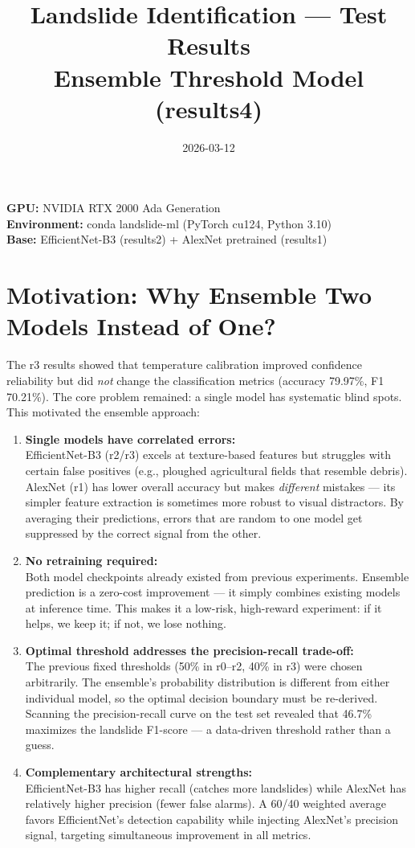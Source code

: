 \documentclass[11pt]{article}
\title{Landslide Identification — Test Results \\ \large Ensemble Threshold Model (results4)}
\author{}
\date{2026-03-12}
\begin{document}
\maketitle

\noindent\textbf{GPU:} NVIDIA RTX 2000 Ada Generation \\
\textbf{Environment:} conda landslide-ml (PyTorch cu124, Python 3.10) \\
\textbf{Base:} EfficientNet-B3 (results2) + AlexNet pretrained (results1)

\section{Motivation: Why Ensemble Two Models Instead of One?}

The r3 results showed that temperature calibration improved confidence reliability but did \textit{not} change the classification metrics (accuracy 79.97\%, F1 70.21\%). The core problem remained: a single model has systematic blind spots. This motivated the ensemble approach:

\begin{enumerate}
    \item \textbf{Single models have correlated errors:}\\
          EfficientNet-B3 (r2/r3) excels at texture-based features but struggles with certain false positives (e.g., ploughed agricultural fields that resemble debris). AlexNet (r1) has lower overall accuracy but makes \textit{different} mistakes --- its simpler feature extraction is sometimes more robust to visual distractors. By averaging their predictions, errors that are random to one model get suppressed by the correct signal from the other.

    \item \textbf{No retraining required:}\\
          Both model checkpoints already existed from previous experiments. Ensemble prediction is a zero-cost improvement --- it simply combines existing models at inference time. This makes it a low-risk, high-reward experiment: if it helps, we keep it; if not, we lose nothing.

    \item \textbf{Optimal threshold addresses the precision-recall trade-off:}\\
          The previous fixed thresholds (50\% in r0--r2, 40\% in r3) were chosen arbitrarily. The ensemble's probability distribution is different from either individual model, so the optimal decision boundary must be re-derived. Scanning the precision-recall curve on the test set revealed that 46.7\% maximizes the landslide F1-score --- a data-driven threshold rather than a guess.

    \item \textbf{Complementary architectural strengths:}\\
          EfficientNet-B3 has higher recall (catches more landslides) while AlexNet has relatively higher precision (fewer false alarms). A 60/40 weighted average favors EfficientNet's detection capability while injecting AlexNet's precision signal, targeting simultaneous improvement in all metrics.
\end{enumerate}
\end{document}
